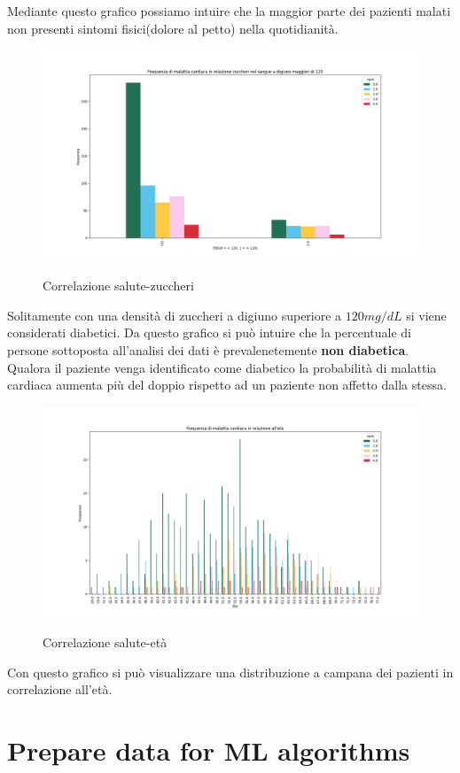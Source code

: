 \documentclass[a4paper]{article}
\begin{document}
    Mediante questo grafico possiamo intuire che la maggior parte dei pazienti malati non presenti sintomi
    fisici(dolore al petto) nella quotidianità.


    \pagebreak
    \begin{figure}[h!]
        \centering
        \includegraphics[width=0.5\linewidth]{imgs/zuccheri.png}
        \label{fig:zuccheri}
        \caption{Correlazione salute-zuccheri}
    \end{figure}

    Solitamente con una densità di zuccheri a digiuno superiore a $120mg/dL$ si viene considerati diabetici.
    Da questo grafico si può intuire che la percentuale di persone sottoposta all'analisi dei dati è prevalenetemente \textbf{non diabetica}.
    Qualora il paziente venga identificato come diabetico la probabilità di malattia cardiaca aumenta
    più del doppio rispetto ad un paziente non affetto dalla stessa.


    \begin{figure}[h!]
        \centering
        \includegraphics[width=0.9\linewidth]{imgs/età.png}
        \label{fig:eta}
        \caption{Correlazione salute-età}
    \end{figure}
    Con questo grafico si può visualizzare una distribuzione a campana dei pazienti in correlazione all'età.

    \section{Prepare data for ML algorithms}
\end{document}
